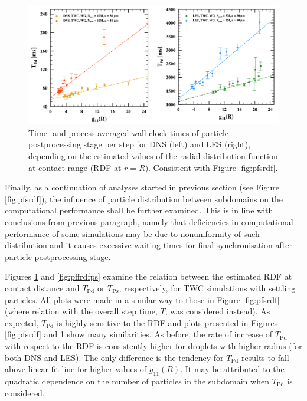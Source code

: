\documentclass{pracamgren}
\begin{document}
\medskip

\begin{figure}[h]
\centering
\includegraphics[width=13.5cm]{figures/3-13_pffrdfpd.pdf}
\caption{
Time- and process-averaged wall-clock times of particle postprocessing stage per step for DNS (left) and LES (right), depending on the estimated values of the radial distribution function at contact range (RDF at $r=R$).
Consistent with Figure \ref{fig:pfsrdf}.
}
\label{fig:pffrdfpd}
\end{figure}

Finally, as a continuation of analyses started in previous section (see Figure \ref{fig:pfsrdf}), the influence of particle distribution between subdomains on the computational performance shall be further examined.
This is in line with conclusions from previous paragraph, namely that deficiencies in computational performance of some simulations may be due to nonuniformity of such distribution and it causes excessive waiting times for final synchronisation after particle postprocessing stage.

Figures \ref{fig:pffrdfpd} and \ref{fig:pffrdfps} examine the relation between the estimated RDF at contact distance and $T_{\text{Pd}}$ or $T_{\text{Ps}}$, respectively, for TWC simulations with settling particles.
All plots were made in a similar way to those in Figure \ref{fig:pfsrdf} (where relation with the overall step time, $T$, was considered instead).
As expected,  $T_{\text{Pd}}$ is highly sensitive to the RDF and plots presented in Figures \ref{fig:pfsrdf} and \ref{fig:pffrdfpd} show many similarities.
As before, the rate of increase of $T_{\text{Pd}}$ with respect to the RDF is consistently higher for droplets with higher radius (for both DNS and LES).  
The only difference is the tendency for $T_{\text{Pd}}$ results to fall above linear fit line for higher values of $g_{11}(R)$.
It may be attributed to the quadratic dependence on the number of particles in the subdomain when $T_{\text{Pd}}$ is considered.
\end{document}
